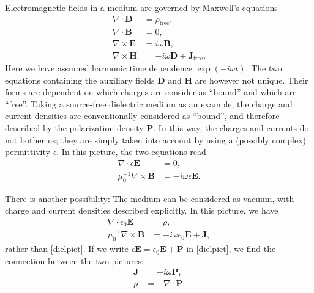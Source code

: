 \documentclass[prb,twocolumn]{revtex4-1}
\newcommand{\vek}[1]{\mathbf{#1}}
\renewcommand{\div}[0]{\nabla\cdot\vek}
\newcommand{\curl}{\nabla\times\vek}
\begin{document}
Electromagnetic fields in a medium are governed by Maxwell's equations
\begin{subequations}\label{ME}
\begin{align}
	\nabla\cdot \vek D &= \rho_\text{free}, \\
	\nabla\cdot \vek B &=0, \label{divB0}\\
	\curl{E} &= i\omega\vek B, \label{Faraday}\\
	\curl H &= -i\omega \vek D + \vek J_\text{free}.
\end{align}
\end{subequations}
Here we have assumed harmonic time dependence $\exp(-i\omega t)$. The two equations containing the auxiliary fields $\vek D$ and $\vek H$ are however not unique. Their forms are dependent on which charges are consider as ``bound'' and which are ``free''. Taking a source-free dielectric medium as an example, the charge and current densities are conventionally considered as ``bound'', and therefore described by the polarization density $\vek P$. In this way, the charges and currents do not bother us; they are simply taken into account by using a (possibly complex) permittivity $\epsilon$. In this picture, the two equations read
\begin{subequations}\label{dielpict}
\begin{align}
\nabla\cdot \epsilon\vek E &= 0 , \\
\mu_0^{-1}\curl B &= -i\omega\epsilon\vek E.
\end{align}
\end{subequations}

There is another possibility: The medium can be considered as vacuum, with charge and current densities described explicitly. In this picture, we have
\begin{subequations}\label{vacpict}
\begin{align}
\nabla\cdot \epsilon_0\vek E &= \rho , \\
\mu_0^{-1}\curl B &= -i\omega\epsilon_0\vek E + \vek J,
\end{align}
\end{subequations}
rather than \eqref{dielpict}. If we write $\epsilon\vek E=\epsilon_0\vek E+\vek P$ in \eqref{dielpict}, we find the connection between the two pictures:
\begin{subequations}\label{connpict}
\begin{align}
\vek J &=-i\omega\vek P, \\
\rho &= -\div P.
\end{align}
\end{subequations}
\end{document}
